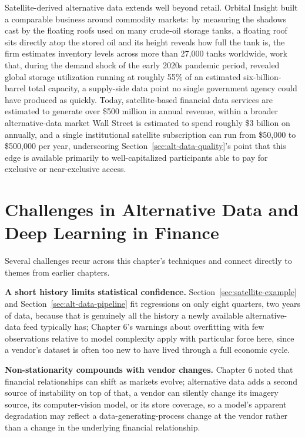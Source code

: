 \documentclass[../ai_in_finance]{subfiles}
\begin{document}
Satellite-derived alternative data extends well beyond retail. Orbital Insight built a comparable business around commodity markets: by measuring the shadows cast by the floating roofs used on many crude-oil storage tanks, a floating roof sits directly atop the stored oil and its height reveals how full the tank is, the firm estimates inventory levels across more than 27,000 tanks worldwide, work that, during the demand shock of the early 2020s pandemic period, revealed global storage utilization running at roughly 55\% of an estimated six-billion-barrel total capacity, a supply-side data point no single government agency could have produced as quickly. Today, satellite-based financial data services are estimated to generate over \$500 million in annual revenue, within a broader alternative-data market Wall Street is estimated to spend roughly \$3 billion on annually, and a single institutional satellite subscription can run from \$50,000 to \$500,000 per year, underscoring Section~\ref{sec:alt-data-quality}'s point that this edge is available primarily to well-capitalized participants able to pay for exclusive or near-exclusive access.

\section{Challenges in Alternative Data and Deep Learning in Finance}

Several challenges recur across this chapter's techniques and connect directly to themes from earlier chapters.

\textbf{A short history limits statistical confidence.} Section~\ref{sec:satellite-example} and Section~\ref{sec:alt-data-pipeline} fit regressions on only eight quarters, two years of data, because that is genuinely all the history a newly available alternative-data feed typically has; Chapter 6's warnings about overfitting with few observations relative to model complexity apply with particular force here, since a vendor's dataset is often too new to have lived through a full economic cycle.

\textbf{Non-stationarity compounds with vendor changes.} Chapter 6 noted that financial relationships can shift as markets evolve; alternative data adds a second source of instability on top of that, a vendor can silently change its imagery source, its computer-vision model, or its store coverage, so a model's apparent degradation may reflect a data-generating-process change at the vendor rather than a change in the underlying financial relationship.
\end{document}
